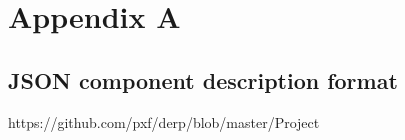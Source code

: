 \chapter{Appendix A}
\section{JSON component description format}

https://github.com/pxf/derp/blob/master/Project%